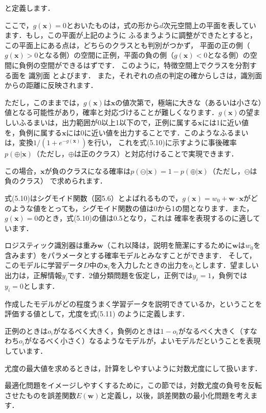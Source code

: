 と定義します．

ここで，$g(\bm{x})=0$とおいたものは，式の形から$d$次元空間上の平面を表しています．もし，この平面が上記のように
ふるまうように調整ができたとすると，この平面上にある点は，どちらのクラスとも判別がつかず，
平面の正の側（$g(\bm{x})>0$となる側）の空間に正例，平面の負の側（$g(\bm{x})<0$となる側）の空間に負例の空間ができるはずです．
このように，特徴空間上でクラスを分割する面を
識別面
とよびます．
また，それぞれの点の判定の確からしさは，識別面からの距離に反映されます．


ただし，このままでは，$g(\bm{x})$は$\bm{x}$の値次第で，極端に大きな（あるいは小さな）値となる可能性があり，確率と対応づけることが難しくなります．$g(\bm{x})$の望ましいふるまいは，出力範囲が0以上1以下ので，正例に属する$\bm{x}$には1に近い値を，負例に属する$\bm{x}$には0に近い値を出力することです．このようなふるまいは，変換$1/(1+e^{-g(\bm{x})})$を行い，
これを式(5.10)に示すように事後確率$p(\oplus|\bm{x})$（ただし，$\oplus$は正のクラス）と対応付けることで実現できます．

この場合，$\bm{x}$が負のクラスになる確率は$p(\ominus|\bm{x}) = 1 - p(\oplus|\bm{x})$（ただし，$\ominus$は負のクラス）
で求められます．

式(5.10)はシグモイド関数（図5.6）とよばれるもので，$g(\bm{x}) = w_0+\bm{w}\cdot\bm{x}$がどのような値をとっても，シグモイド関数の値は0から1の間となります．また，$g(\bm{x})=0$のとき，式(5.10)の値は0.5となり，これは
確率を表現するのに適しています．


ロジスティック識別器は重み$\bm{w}$（これ以降は，説明を簡潔にするために$\bm{w}$は$w_0$を含みます）をパラメータとする確率モデルとみなすことができます．
そして，このモデルに学習データ$D$中の$\bm{x}_i$を入力したときの出力を$o_i$とします．望ましい出力は，正解情報$y_i$です．2値分類問題を仮定し，正例では$y_i=1$，負例では$y_i=0$とします．

作成したモデルがどの程度うまく学習データを説明できているか，ということを評価する値として，尤度を式(5.11)
のように定義します．

正例のときは$o_i$がなるべく大きく，負例のときは$1-o_i$がなるべく大きく（すなわち$o_i$がなるべく小さく）なるようなモデルが，よいモデルだということを表現しています．

尤度の最大値を求めるときは，計算をしやすいように対数尤度にして扱います．

最適化問題をイメージしやすくするために，この節では，対数尤度の負号を反転させたものを誤差関数$E(\bm{w})$と定義し，以後，誤差関数の最小化問題を考えます．

